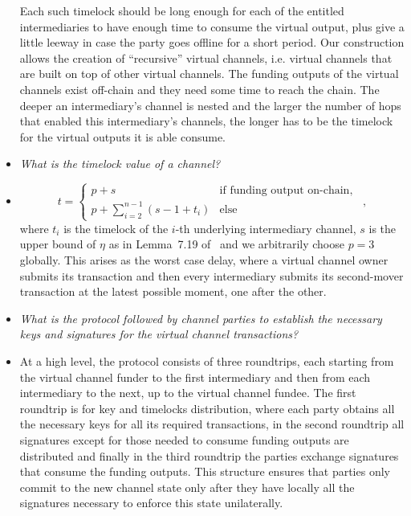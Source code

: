 \begin{itemize}
  Each such timelock should be long enough for each of the entitled
  intermediaries to have enough time to consume the virtual output, plus give a
  little leeway in case the party goes offline for a short period. Our
  construction allows the creation of ``recursive'' virtual channels, i.e.
  virtual channels that are built on top of other virtual channels. The funding
  outputs of the virtual channels exist off-chain and they need some time to
  reach the chain. The deeper an intermediary's channel is nested and the larger
  the number of hops that enabled this intermediary's channels, the longer has
  to be the timelock for the virtual outputs it is able consume.
  \item \emph{What is the timelock value of a channel?}
  \item
  \begin{equation}
    t =
      \begin{cases}
        p + s & \mbox{if funding output on-chain}, \\
        p + \sum\limits_{i = 2}^{n-1}(s - 1 + t_i) & \mbox{else}
      \end{cases} \enspace,
  \end{equation}
  where $t_i$ is the timelock of the $i$-th underlying intermediary channel, $s$
  is the upper bound of $\eta$ as in Lemma~7.19 of~\cite{BMTZ17} and we
  arbitrarily choose $p = 3$ globally. This arises as the worst case delay,
  where a virtual channel owner submits its transaction and then every
  intermediary submits its second-mover transaction at the latest possible
  moment, one after the other.
  \item \emph{What is the protocol followed by channel parties to establish the
  necessary keys and signatures for the virtual channel transactions?}
  \item At a high level, the protocol consists of three roundtrips, each
  starting from the virtual channel funder to the first intermediary and then
  from each intermediary to the next, up to the virtual channel fundee. The
  first roundtrip is for key and timelocks distribution, where each party
  obtains all the necessary keys for all its required transactions, in the
  second roundtrip all signatures except for those needed to consume funding
  outputs are distributed and finally in the third roundtrip the parties
  exchange signatures that consume the funding outputs. This structure ensures
  that parties only commit to the new channel state only after they have locally
  all the signatures necessary to enforce this state unilaterally.
\end{itemize}

